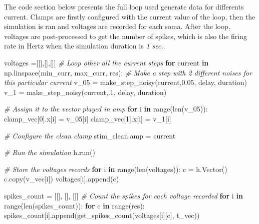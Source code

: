 \documentclass[]{article}
\newenvironment{Shaded}{}{}
\newcommand{\BuiltInTok}[1]{#1}
\newcommand{\CommentTok}[1]{\textcolor[rgb]{0.38,0.63,0.69}{\textit{#1}}}
\newcommand{\ControlFlowTok}[1]{\textcolor[rgb]{0.00,0.44,0.13}{\textbf{#1}}}
\newcommand{\DecValTok}[1]{\textcolor[rgb]{0.25,0.63,0.44}{#1}}
\newcommand{\FloatTok}[1]{\textcolor[rgb]{0.25,0.63,0.44}{#1}}
\newcommand{\KeywordTok}[1]{\textcolor[rgb]{0.00,0.44,0.13}{\textbf{#1}}}
\newcommand{\NormalTok}[1]{#1}
\newcommand{\OperatorTok}[1]{\textcolor[rgb]{0.40,0.40,0.40}{#1}}
\begin{document}
The code section below presents the full loop used generate data for
differents current. Clamps are firstly configured with the current value
of the loop, then the simulation is ran and voltages are recorded for
each soma. After the loop, voltages are post-processed to get the number
of spikes, which is also the firing rate in Hertz when the simulation
duration is \emph{1 sec.}.

\begin{Shaded}
\begin{Highlighting}[]
\NormalTok{voltages }\OperatorTok{=}\NormalTok{[[],[],[]]}
\CommentTok{# Loop other all the current steps}
\ControlFlowTok{for}\NormalTok{ current }\KeywordTok{in}\NormalTok{ np.linspace(min_curr, max_curr, res): }
    \CommentTok{# Make a step with 2 different noises for this particular current }
\NormalTok{    v_05 }\OperatorTok{=}\NormalTok{ make_step_noisy(current,}\FloatTok{0.05}\NormalTok{, delay, duration)}
\NormalTok{    v_1 }\OperatorTok{=}\NormalTok{ make_step_noisy(current,.}\DecValTok{1}\NormalTok{, delay, duration) }

    \CommentTok{# Assign it to the vector played in amp}
    \ControlFlowTok{for}\NormalTok{ i }\KeywordTok{in} \BuiltInTok{range}\NormalTok{(}\BuiltInTok{len}\NormalTok{(v_05)):}
\NormalTok{        clamp_vec[}\DecValTok{0}\NormalTok{].x[i] }\OperatorTok{=}\NormalTok{ v_05[i]}
\NormalTok{        clamp_vec[}\DecValTok{1}\NormalTok{].x[i] }\OperatorTok{=}\NormalTok{ v_1[i]}

    \CommentTok{# Configure the clean clamp}
\NormalTok{    stim_clean.amp }\OperatorTok{=}\NormalTok{ current}

    \CommentTok{# Run the simulation }
\NormalTok{    h.run() }

    \CommentTok{# Store the voltages records}
    \ControlFlowTok{for}\NormalTok{ i }\KeywordTok{in} \BuiltInTok{range}\NormalTok{(}\BuiltInTok{len}\NormalTok{(voltages)): }
\NormalTok{        c }\OperatorTok{=}\NormalTok{ h.Vector() }
\NormalTok{        c.copy(v_vec[i])}
\NormalTok{        voltages[i].append(c)}


\NormalTok{spikes_count }\OperatorTok{=}\NormalTok{ [[], [], []]}
\CommentTok{# Count the spikes for each voltage recorded}
\ControlFlowTok{for}\NormalTok{ i }\KeywordTok{in} \BuiltInTok{range}\NormalTok{(}\BuiltInTok{len}\NormalTok{(spikes_count)): }
    \ControlFlowTok{for}\NormalTok{ c }\KeywordTok{in} \BuiltInTok{range}\NormalTok{(res): }
\NormalTok{        spikes_count[i].append(get_spikes_count(voltages[i][c], t_vec)) }
\end{Highlighting}
\end{Shaded}
\end{document}
